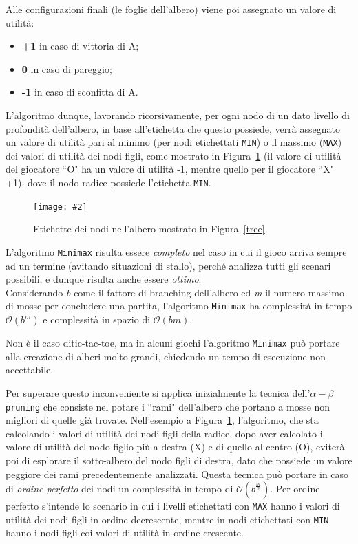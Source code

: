 \documentclass[11pt, a4paper]{article}
\newcommand{\tic}{tic-tac-toe}
\newcommand{\comp}[1]{$\mathcal{O}(#1)$}
\newcommand{\image}[4]{
	\begin{figure}[H]
		\centering
		\texttt{[image: \#2]}
		\caption{#3.}
		\label{#4}
	\end{figure}
}
\begin{document}
Alle configurazioni finali (le foglie dell'albero) viene poi assegnato un valore di utilità:
\begin{itemize}
	\item \textbf{+1} in caso di vittoria di A;
	\item \textbf{0} in caso di pareggio;
	\item \textbf{-1} in caso di sconfitta di A.
\end{itemize}
L'algoritmo dunque, lavorando ricorsivamente, per ogni nodo di un dato livello di profondità dell'albero, in base all'etichetta che questo possiede, verrà assegnato un valore di utilità pari al minimo (per nodi etichettati \texttt{MIN}) o il massimo (\texttt{MAX}) dei valori di utilità dei nodi figli, come mostrato in Figura~\ref{values} (il valore di utilità del giocatore ``O" ha un valore di utilità -1, mentre quello per il giocatore ``X" +1), dove il nodo radice possiede l'etichetta \texttt{MIN}.

\image{0.5}{minimaxvalues}{Etichette dei nodi nell'albero mostrato in Figura~\ref{tree}}{values}

L'algoritmo \texttt{Minimax} risulta essere \textit{completo} nel caso in cui il gioco arriva sempre ad un termine (avitando situazioni di stallo), perché analizza tutti gli scenari possibili, e dunque risulta anche essere \textit{ottimo}.\\
Considerando \textit{b} come il fattore di branching dell'albero ed \textit{m} il numero massimo di mosse per concludere una partita, l'algoritmo \texttt{Minimax} ha complessità in tempo \comp{b^m} e complessità in spazio di \comp{bm}.

Non è il caso di\tic, ma in alcuni giochi l'algoritmo \texttt{Minimax} può portare alla creazione di alberi molto grandi, chiedendo un tempo di esecuzione non accettabile.

Per superare questo inconveniente si applica inizialmente la tecnica dell'\texttt{$\alpha-\beta$ pruning} che consiste nel potare i ``rami" dell'albero che portano a mosse non migliori di quelle già trovate. Nell'esempio a Figura~\ref{values}, l'algoritmo, che sta calcolando i valori di utilità dei nodi figli della radice, dopo aver calcolato il valore di utilità del nodo figlio più a destra (X) e di quello al centro (O), eviterà poi di esplorare il sotto-albero del nodo figli di destra, dato che possiede un valore peggiore dei rami precedentemente analizzati. Questa tecnica può portare in caso di \textit{ordine perfetto} dei nodi un complessità in tempo di \comp{b^{\frac{m}{2}}}. Per ordine perfetto s'intende lo scenario in cui i livelli etichettati con \texttt{MAX} hanno i valori di utilità dei nodi figli in ordine decrescente, mentre in nodi etichettati con \texttt{MIN} hanno i nodi figli coi valori di utilità in ordine crescente.
	
\end{document}
